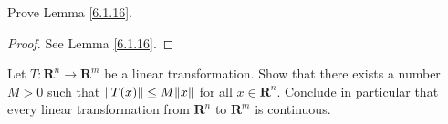 \begin{exercise}\label{ex 6.1.3}
    Prove Lemma \ref{6.1.16}.
\end{exercise}

\begin{proof}
    See Lemma \ref{6.1.16}.
\end{proof}

\begin{exercise}\label{ex 6.1.4}
    Let \(T : \mathbf{R}^n \to \mathbf{R}^m\) be a linear transformation.
    Show that there exists a number \(M > 0\) such that \(\norm*{T(x)} \leq M \norm*{x}\) for all \(x \in \mathbf{R}^n\).
    Conclude in particular that every linear transformation from \(\mathbf{R}^n\) to \(\mathbf{R}^m\) is continuous.
\end{exercise}
